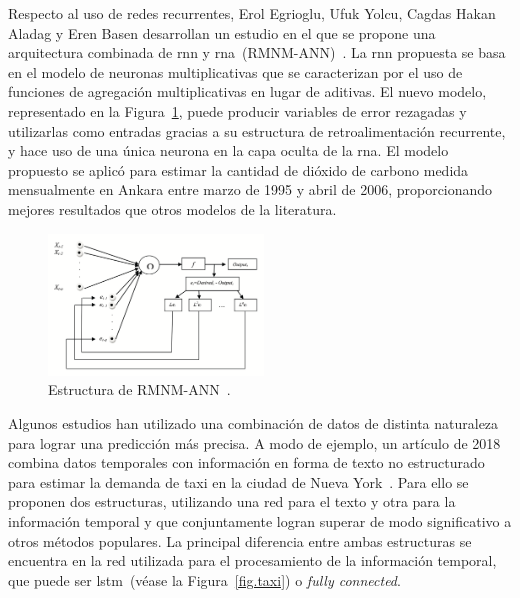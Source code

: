 Respecto al uso de redes recurrentes, Erol Egrioglu, Ufuk Yolcu, Cagdas Hakan Aladag y Eren Basen desarrollan un estudio en el que se propone una arquitectura combinada de \acrshort{rnn} y \acrshort{rna}~(RMNM-ANN)~\cite{multiplicative}. La \acrshort{rnn} propuesta se basa en el modelo de neuronas multiplicativas que se caracterizan por el uso de funciones de agregación multiplicativas en lugar de aditivas. El nuevo modelo, representado en la Figura~\ref{fig.rmnm-ann}, puede producir variables de error rezagadas y utilizarlas como entradas gracias a su estructura de retroalimentación recurrente, y hace uso de una única neurona en la capa oculta de la \acrshort{rna}. El modelo propuesto se aplicó para estimar la cantidad de dióxido de carbono medida mensualmente en Ankara entre marzo de 1995 y abril de 2006, proporcionando mejores resultados que otros modelos de la literatura.

\vspace{10pt}
\begin{figure}[H]
	\begin{center}
		\includegraphics[width=0.51\textwidth]{ figures/estadoarte/rmnm-ann.png}
		\caption{Estructura de RMNM-ANN~\cite{multiplicative}.
		}
		\label{fig.rmnm-ann}
	\end{center}
\end{figure}
\vspace{-10pt}

Algunos estudios han utilizado una combinación de datos de distinta naturaleza para lograr una predicción más precisa. A modo de ejemplo, un artículo de 2018  combina datos temporales con información en forma de texto no estructurado para estimar la demanda de taxi en la ciudad de Nueva York~\cite{taxi}. Para ello se proponen dos estructuras, utilizando una red para el texto y otra para la información temporal y que conjuntamente logran superar de modo significativo a otros métodos populares. La principal diferencia entre ambas estructuras se encuentra en la red utilizada para el procesamiento de la información temporal, que puede ser \acrshort{lstm}~(véase la Figura~\ref{fig.taxi}) o \textit{fully connected}.

